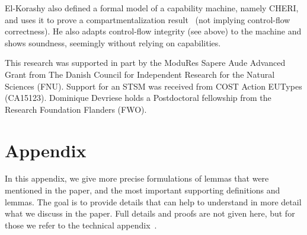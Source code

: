 \documentclass[format=acmsmall, review=true, screen=true]{acmart}
\begin{document}
El-Korashy also defined a formal model of a capability machine, namely CHERI,
and uses it to prove a compartmentalization
result~\citep{akram_el-korashy_formal_2016} (not implying control-flow
correctness). He also adapts control-flow integrity (see above) to the machine
and shows soundness, seemingly without relying on capabilities.

\begin{acks}
This research was supported in part by the ModuRes Sapere Aude Advanced Grant
from The Danish Council for Independent Research for the Natural Sciences (FNU). 
Support for an STSM was received from COST Action EUTypes (CA15123).
Dominique Devriese holds a Postdoctoral fellowship from the Research Foundation Flanders (FWO).
\end{acks}






\appendix
\section{Appendix}
In this appendix, we give more precise formulations of lemmas that were mentioned in the paper, and the most important supporting definitions and lemmas.
The goal is to provide details that can help to understand in more detail what we discuss in the paper. 
Full details and proofs are not given here, but for those we refer to the technical appendix~\citep{technical_appendix}.
\end{document}
